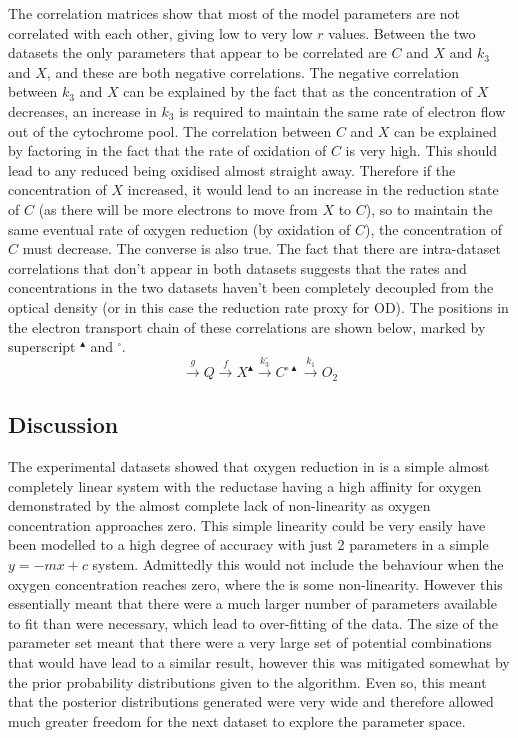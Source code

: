 The correlation matrices show that most of the model parameters are not correlated with each other, giving low to very low $r$ values. Between the two datasets the only parameters that appear to be correlated are $C$ and $X$ and $k_3$ and $X$, and these are both negative correlations. The negative correlation between $k_3$ and $X$ can be explained by the fact that as the concentration of $X$ decreases, an increase in $k_3$ is required to maintain the same rate of electron flow out of the cytochrome pool. The correlation between $C$ and $X$ can be explained by factoring in the fact that the rate of oxidation of $C$ is very high. This should lead to any reduced \cbbthree{} being oxidised almost straight away. Therefore if the concentration of $X$ increased, it would lead to an increase in the reduction state of $C$ (as there will be more electrons to move from $X$ to $C$), so to maintain the same eventual rate of oxygen reduction (by oxidation of $C$), the concentration of $C$ must decrease. The converse is 
also true.
The fact that there are intra-dataset correlations that don't appear in both datasets suggests that the rates and concentrations in the two datasets haven't been completely decoupled from the optical density (or in this case the reduction rate proxy for OD). The positions in the electron transport chain of these correlations are shown below, marked by superscript $^\blacktriangle$ and $^\square$.
\begin{equation*}
\xrightarrow{g}Q\xrightarrow{f}X^{\blacktriangle}\xrightarrow{k_3^{\square}}C^{\square\blacktriangle}\xrightarrow{k_1}O_2
\end{equation*}

\subsection{Discussion}
The experimental datasets showed that oxygen reduction in \Nm{} is a simple almost completely linear system with the reductase having a high affinity for oxygen demonstrated by the almost complete lack of non-linearity as oxygen concentration approaches zero. This simple linearity could be very easily have been modelled to a high degree of accuracy with just 2 parameters in a simple $y=-mx+c$ system. Admittedly this would not include the behaviour when the oxygen concentration reaches zero, where the is some non-linearity. However this essentially meant that there were a much larger number of parameters available to fit than were necessary, which lead to over-fitting of the data. The size of the parameter set meant that there were a very large set of potential combinations that would have lead to a similar result, however this was mitigated somewhat by the prior probability distributions given to the algorithm. Even so, this meant that the posterior distributions generated were very wide and therefore 
allowed much greater freedom for the next dataset to explore the parameter space.


